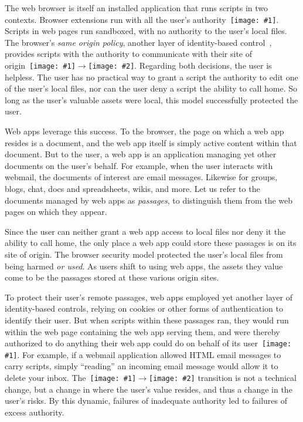 \documentclass[letterpaper,twocolumn,10pt]{article}
\newcommand{\q}[1]{{\texttt{[image: \#1]}}}
\newcommand{\qq}[2]{{\texttt{[image: \#1]}}$\rightarrow${\texttt{[image: \#2]}}}
\begin{document}
The web browser is itself an installed application that runs scripts in two 
contexts. Browser extensions run with all the user's authority~\q{2}. Scripts 
in web pages run sandboxed, with no authority to the user's local files. The 
browser's \emph{same origin policy}, another layer of identity-based 
control~\cite{mashupos}, provides scripts with the authority to communicate 
with their site of origin~\qq{1}{3}. Regarding both decisions, the user is 
helpless. The user has no practical way to grant a script the authority to 
edit one of the user's local files, nor can the user deny a script the 
ability to call home. So long as the user's valuable assets were local, this 
model successfully protected the user.

Web apps leverage this success. To the browser, the page on which a web app 
resides is a document, and the web app itself is simply active content within 
that document. But to the user, a web app is an application managing yet 
other documents on the user's behalf. For example, when the user interacts 
with webmail, the documents of interest are email messages. Likewise for 
groups, blogs, chat, docs and spreadsheets, wikis, and more. Let us refer to 
the documents managed by web apps as \emph{passages}, to distinguish them 
from the web pages on which they appear.

Since the user can neither grant a web app access to local files nor deny it 
the ability to call home, the only place a web app could store these passages 
is on its site of origin. The browser security model protected the user's 
local files from being harmed \emph{or used}. As users shift to using web 
apps, the assets they value come to be the passages stored at these various 
origin sites. 

To protect their user's remote passages, web apps employed yet another layer 
of identity-based controls, relying on cookies or other forms of 
authentication to identify their user. But when scripts within these passages 
ran, they would run within the web page containing the web app serving them, 
and were thereby authorized to do anything their web app could do on behalf 
of its user~\q{4}. For example, if a webmail application allowed HTML email 
messages to carry scripts, simply ``reading'' an incoming email message would 
allow it to delete your inbox. The~\qq{3}{4} transition is not a technical 
change, but a change in where the user's value resides, and thus a change in 
the user's risks. By this dynamic, failures of inadequate authority led to 
failures of excess authority.
\end{document}
